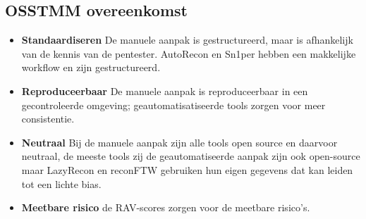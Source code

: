 \subsection{OSSTMM overeenkomst}
\begin{itemize}
  \item \textbf{Standaardiseren} De manuele aanpak is gestructureerd, maar is afhankelijk van de kennis van de pentester. AutoRecon en Sn1per hebben een makkelijke workflow en zijn gestructureerd.
  \item \textbf{Reproduceerbaar} De manuele aanpak is reproduceerbaar in een gecontroleerde omgeving; geautomatisatiseerde tools zorgen voor meer consistentie.
  \item \textbf{Neutraal} Bij de manuele aanpak zijn alle tools open source en daarvoor neutraal, de meeste tools zij de geautomatiseerde aanpak zijn ook open-source maar LazyRecon en reconFTW gebruiken hun eigen gegevens dat kan leiden tot een lichte bias.
  \item \textbf{Meetbare risico} de RAV-scores zorgen voor de meetbare risico's.
\end{itemize}




  
  
